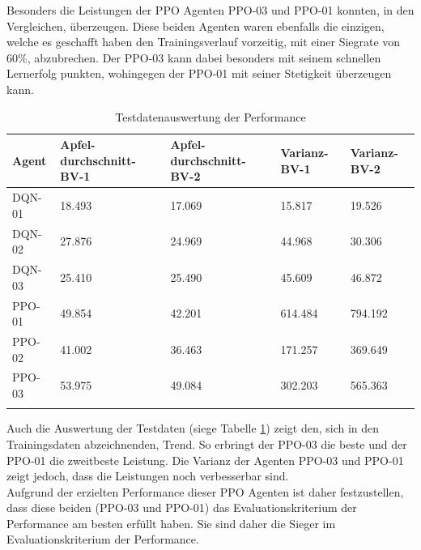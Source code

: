 Besonders die Leistungen der PPO Agenten PPO-03 und PPO-01 konnten, in den Vergleichen, überzeugen. Diese beiden Agenten waren ebenfalls die einzigen, welche es geschafft haben den Trainingsverlauf vorzeitig, mit einer Siegrate von 60\%, abzubrechen. 
Der PPO-03 kann dabei besonders mit seinem schnellen Lernerfolg punkten, wohingegen der PPO-01 mit seiner Stetigkeit überzeugen kann.
\begin{longtable}[h]{|p{2.7cm}|p{3cm}|p{3cm}|p{2cm}|p{2cm}|}
	\hline
	Agent & Apfel-durchschnitt-BV-1 & Apfel-durchschnitt-BV-2 & Varianz-BV-1 & Varianz-BV-2 \\
	\hline
	DQN-01 & 18.493 & 17.069 & 15.817 & 19.526 \\
	\hline
	DQN-02 & 27.876 & 24.969 & 44.968 & 30.306 \\
	\hline
	DQN-03 & 25.410 & 25.490 & 45.609 & 46.872 \\
	\hline
	PPO-01 & 49.854 & 42.201 & 614.484 & 794.192 \\
	\hline
	PPO-02 & 41.002 & 36.463 & 171.257 & 369.649 \\
	\hline
	PPO-03 & 53.975 & 49.084 & 302.203 & 565.363\\
	\hline
\caption{Testdatenauswertung der Performance}
\label{tab:Evaluation_Testdaten_Performance} 
\end{longtable}
Auch die Auswertung der Testdaten (siege Tabelle \ref{tab:Evaluation_Testdaten_Performance}) zeigt den, sich in den Trainingsdaten abzeichnenden, Trend. So erbringt der PPO-03 die beste und der PPO-01 die zweitbeste Leistung. Die Varianz der Agenten PPO-03 und PPO-01 zeigt jedoch, dass die Leistungen noch verbesserbar sind.\\
Aufgrund der erzielten Performance dieser PPO Agenten ist daher festzustellen, dass diese beiden (PPO-03 und PPO-01) das Evaluationskriterium der Performance am besten erfüllt haben. Sie sind daher die Sieger im Evaluationskriterium der Performance.

